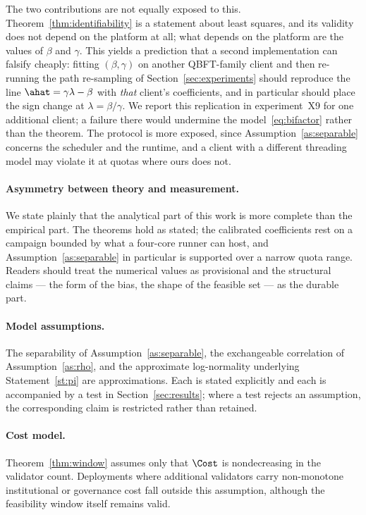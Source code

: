 The two contributions are not equally exposed to this.
Theorem~\ref{thm:identifiability} is a statement about least squares, and its
validity does not depend on the platform at all; what depends on the platform
are the values of $\beta$ and $\gamma$. This yields a prediction that a second
implementation can falsify cheaply: fitting $(\beta,\gamma)$ on another
QBFT-family client and then re-running the path re-sampling of
Section~\ref{sec:experiments} should reproduce the line $\ahat=\gamma\lambda-\beta$
with \emph{that} client's coefficients, and in particular should place the sign
change at $\lambda=\beta/\gamma$. We report this replication in
experiment~X9 for one additional client; a failure there would undermine the
model~\eqref{eq:bifactor} rather than the theorem. The
\RNM{} protocol is more exposed, since Assumption~\ref{as:separable} concerns
the scheduler and the runtime, and a client with a different threading model may
violate it at quotas where ours does not.

\paragraph{Asymmetry between theory and measurement.}
We state plainly that the analytical part of this work is more complete than the
empirical part. The theorems hold as stated; the calibrated coefficients rest on
a campaign bounded by what a four-core runner can host, and
Assumption~\ref{as:separable} in particular is supported over a narrow quota
range. Readers should treat the numerical values as provisional and the
structural claims --- the form of the bias, the shape of the feasible set --- as
the durable part.

\paragraph{Model assumptions.}
The separability of Assumption~\ref{as:separable}, the exchangeable correlation
of Assumption~\ref{as:rho}, and the approximate log-normality underlying
Statement~\ref{st:pi} are approximations. Each is stated explicitly and each is
accompanied by a test in Section~\ref{sec:results}; where a test rejects an
assumption, the corresponding claim is restricted rather than retained.

\paragraph{Cost model.}
Theorem~\ref{thm:window} assumes only that $\Cost$ is nondecreasing in the
validator count. Deployments where additional validators carry
non-monotone institutional or governance cost fall outside this assumption,
although the feasibility window itself remains valid.
